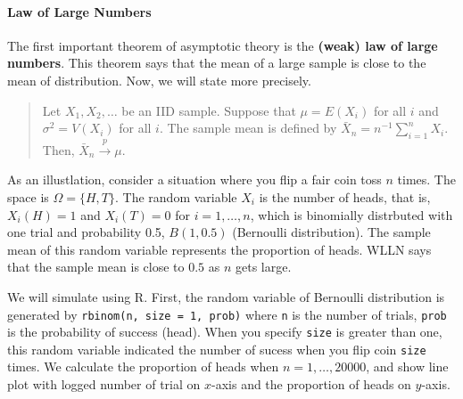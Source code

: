 \documentclass[
  12pt,
]{article}
\begin{document}
\hypertarget{law-of-large-numbers}{%
\paragraph{Law of Large Numbers}\label{law-of-large-numbers}}

The first important theorem of asymptotic theory is the \textbf{(weak) law of large numbers}.
This theorem says that the mean of a large sample is close to the mean of distribution.
Now, we will state more precisely.

\begin{quote}
Let \(X_1, X_2, \ldots\) be an IID sample. Suppose that \(\mu = E(X_i)\) for all \(i\) and \(\sigma^2 = V(X_i)\) for all \(i\).
The sample mean is defined by \(\bar{X}_n = n^{-1} \sum_{i=1}^n X_i\). Then, \(\bar{X}_n \stackrel{p}{\to} \mu\).
\end{quote}

As an illustlation,
consider a situation where you flip a fair coin toss \(n\) times.
The space is \(\Omega = \{H, T\}\).
The random variable \(X_i\) is the number of heads,
that is, \(X_i(H) = 1\) and \(X_i(T) = 0\) for \(i = 1, \ldots, n\),
which is binomially distrbuted with one trial and probability 0.5, \(B(1, 0.5)\) (Bernoulli distribution).
The sample mean of this random variable represents the proportion of heads.
WLLN says that the sample mean is close to \(0.5\) as \(n\) gets large.

We will simulate using R.
First, the random variable of Bernoulli distribution is generated by \texttt{rbinom(n,\ size\ =\ 1,\ prob)}
where \texttt{n} is the number of trials, \texttt{prob} is the probability of success (head).
When you specify \texttt{size} is greater than one,
this random variable indicated the number of sucess when you flip coin \texttt{size} times.
We calculate the proportion of heads when \(n = 1, \ldots, 20000\),
and show line plot with logged number of trial on \(x\)-axis and
the proportion of heads on \(y\)-axis.
\end{document}
